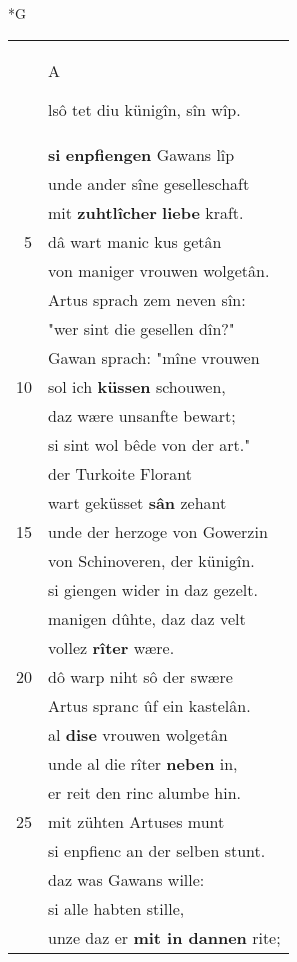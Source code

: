 \documentclass[8pt,a4paper,notitlepage]{article}
\begin{document}
\begin{table}[ht]
\begin{minipage}[t]{0.5\linewidth}
\small
\begin{center}*G
\end{center}
\begin{tabular}{rl}
 & \begin{large}A\end{large}lsô tet diu künigîn, sîn wîp.\\ 
 & \textbf{si} \textbf{enpfiengen} Gawans lîp\\ 
 & unde ander sîne geselleschaft\\ 
 & mit \textbf{zuhtlîcher} \textbf{liebe} kraft.\\ 
5 & dâ wart manic kus getân\\ 
 & von maniger vrouwen wolgetân.\\ 
 & Artus sprach zem neven sîn:\\ 
 & "wer sint die gesellen dîn?"\\ 
 & Gawan sprach: "mîne vrouwen\\ 
10 & sol ich \textbf{küssen} schouwen,\\ 
 & daz wære unsanfte bewart;\\ 
 & si sint wol bêde von der art."\\ 
 & der Turkoite Florant\\ 
 & wart geküsset \textbf{sân} zehant\\ 
15 & unde der herzoge von Gowerzin\\ 
 & von Schinoveren, der künigîn.\\ 
 & si giengen wider in daz gezelt.\\ 
 & manigen dûhte, daz daz velt\\ 
 & vollez \textbf{rîter} wære.\\ 
20 & dô warp niht sô der swære\\ 
 & Artus spranc ûf ein kastelân.\\ 
 & al \textbf{dise} vrouwen wolgetân\\ 
 & unde al die rîter \textbf{neben} in,\\ 
 & er reit den rinc alumbe hin.\\ 
25 & mit zühten Artuses munt\\ 
 & si enpfienc an der selben stunt.\\ 
 & daz was Gawans wille:\\ 
 & si alle habten stille,\\ 
 & unze daz er \textbf{mit in dannen} rite;\\ 

\end{tabular}
\end{minipage}
\end{table}
\end{document}
